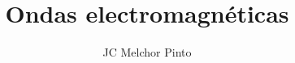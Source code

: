 \documentclass[12pt,addpoints,answers]{guia}
\title{Ondas electromagnéticas}
\author{JC Melchor Pinto}
\begin{document}
\INFO%


\ejemplosboxed[]%
\begin{questions}
    \questionboxed[20]{}
    \questionboxed[20]{}
    
    \questionboxed[10]{}
    \questionboxed[10]{}
    \questionboxed[15]{}
    
    \questionboxed[25]{}
\end{questions}
\end{document}
